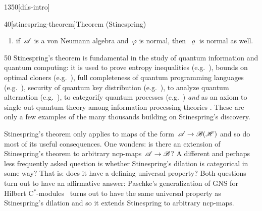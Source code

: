 \begin{parsec}{1350}[dils-intro]
\begin{point}{40}[stinespring-theorem]{Theorem (Stinespring)}
\begin{enumerate}
\item
    if~$\mathscr{A}$ is a von Neumann algebra
    and~$\varphi$ is normal, then~$\varrho$ is normal as well.
\end{enumerate}
\end{point}
\spacingfix{}
\begin{point}{50}%
Stinespring's theorem
is fundamental in the study
of quantum information and quantum computing:
it is used to prove entropy inequalities (e.g.~\cite{lindblad}),
bounds on optimal cloners (e.g.~\cite{werner}),
full completeness of quantum programming languages (e.g.~\cite{staton}),
security of quantum key distribution (e.g.~\cite{werner2,kissinger2017picture}),
to analyze quantum alternation (e.g.~\cite{prakash}),
to categorify quantum processes (e.g.~\cite{selinger}) \emph{and}
as an axiom to single out
quantum theory among information processing theories \cite{chiribella}.
These are only a few examples
    of the many thousands building on Stinespring's discovery.

Stinespring's theorem only applies
to maps of the form~$\mathscr{A} \to \mathscr{B}(\mathscr{H})$
    and so do most of its useful consequences.
One wonders:
    is there an extension of Stinespring's theorem
    to arbitrary ncp-maps~$\mathscr{A} \to \mathscr{B}$?
A different and perhaps less frequently asked question is whether
     Stinespring's dilation is categorical in some way?
That is: does it have a defining universal property?
Both questions turn out to have an affirmative answer:
Paschke's generalization of GNS for Hilbert C$^*$-modules~\cite{paschke}
    turns out to have the same universal property
        as Stinespring's dilation and so it extends Stinespring
        to arbitrary ncp-maps.


\end{point}
\end{parsec}
